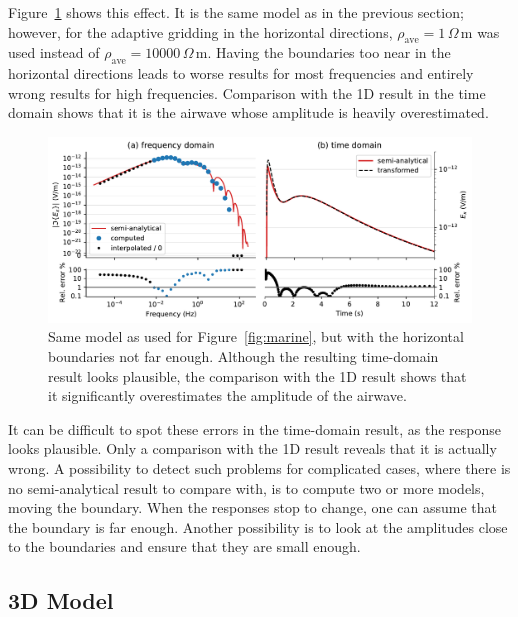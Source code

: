 \documentclass[extra, camera,%
    onecolumn,   %
    referee,     %
]{gji}
\newlength{\fwidth}
\newcommand{\mr}[1]{\mathrm{#1}}
\newcommand{\ohmm}{\ensuremath{\Omega\,}\text{m}\xspace}
\begin{document}
Figure~\ref{fig:marine-wrong-x-y} shows this effect. It is the same model as in
the previous section; however, for the adaptive gridding in the horizontal
directions, $\rho_\mr{ave}=1\,\ohmm$ was used instead of
$\rho_\mr{ave}=\num{10000}\,\ohmm$. Having the boundaries too near in the
horizontal directions leads to worse results for most frequencies and entirely
wrong results for high frequencies. Comparison with the 1D result in the time
domain shows that it is the airwave whose amplitude is heavily overestimated.
%
\begin{figure}
  \centering
  \includegraphics[width=\fwidth]{08-marine-wrong-x-y}
  \caption{Same model as used for Figure~\ref{fig:marine}, but with the
    horizontal boundaries not far enough. Although the resulting time-domain
    result looks plausible, the comparison with the 1D result shows that it
    significantly overestimates the amplitude of the airwave.}
  \label{fig:marine-wrong-x-y}
\end{figure}
%
It can be difficult to spot these errors in the time-domain result, as the
response looks plausible. Only a comparison with the 1D result reveals that it
is actually wrong. A possibility to detect such problems for complicated cases,
where there is no semi-analytical result to compare with, is to compute two or
more models, moving the boundary. When the responses stop to change, one can
assume that the boundary is far enough. Another possibility is to look at the
amplitudes close to the boundaries and ensure that they are small enough.


\subsection{3D Model} %
\end{document}
